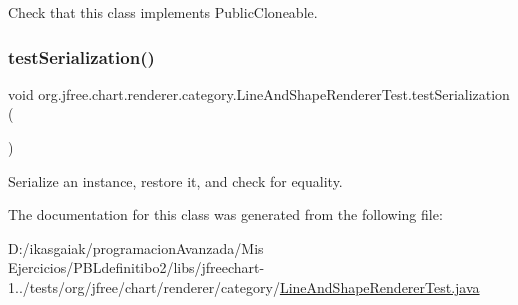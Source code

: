 Check that this class implements Public\+Cloneable. \mbox{\label{classorg_1_1jfree_1_1chart_1_1renderer_1_1category_1_1_line_and_shape_renderer_test_a991fda9341ccca49d1682f97e5c3254c}} 
\subsubsection{\texorpdfstring{test\+Serialization()}{testSerialization()}}
{\footnotesize\ttfamily void org.\+jfree.\+chart.\+renderer.\+category.\+Line\+And\+Shape\+Renderer\+Test.\+test\+Serialization (\begin{DoxyParamCaption}{ }\end{DoxyParamCaption})}

Serialize an instance, restore it, and check for equality. 

The documentation for this class was generated from the following file\+:\begin{DoxyCompactItemize}
\item 
D\+:/ikasgaiak/programacion\+Avanzada/\+Mis Ejercicios/\+P\+B\+Ldefinitibo2/libs/jfreechart-\/1../tests/org/jfree/chart/renderer/category/\mbox{\hyperlink{_line_and_shape_renderer_test_8java}{Line\+And\+Shape\+Renderer\+Test.\+java}}\end{DoxyCompactItemize}
